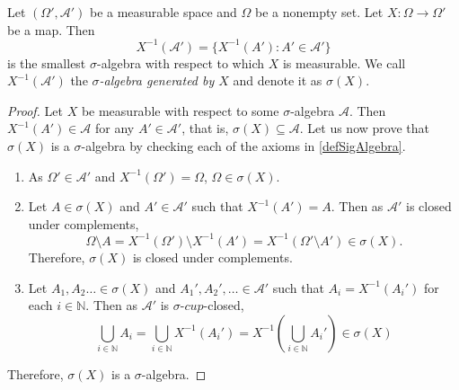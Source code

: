 \begin{theorem}
    Let $(\Omega',\mathcal{A}')$ be a measurable space and $\Omega$ be a nonempty set. Let $X:\Omega\to\Omega'$ be a map. Then
    $$X^{-1}(\mathcal{A}')=\{X^{-1}(A'):A'\in\mathcal{A}'\}$$
    is the smallest $\sigma$-algebra with respect to which $X$ is measurable. We call $X^{-1}(\mathcal{A}')$ the \textit{$\sigma$-algebra generated by $X$} and denote it as $\sigma(X)$.
\end{theorem}
\begin{proof}
    Let $X$ be measurable with respect to some $\sigma$-algebra $\mathcal{A}$. Then $X^{-1}(A')\in\mathcal{A}$ for any $A'\in\mathcal{A}'$, that is, $\sigma(X)\subseteq\mathcal{A}$. Let us now prove that $\sigma(X)$ is a $\sigma$-algebra by checking each of the axioms in \ref{defSigAlgebra}.
    \begin{enumerate}
        \item As $\Omega'\in\mathcal{A}'$ and $X^{-1}(\Omega')=\Omega$, $\Omega\in\sigma(X)$.
        
        \item Let $A\in\sigma(X)$ and $A'\in\mathcal{A}'$ such that $X^{-1}(A')=A$. Then as $\mathcal{A}'$ is closed under complements,
        $$\Omega\setminus A = X^{-1}(\Omega')\setminus X^{-1}(A') = X^{-1}(\Omega'\setminus A')\in\sigma(X).$$
        Therefore, $\sigma(X)$ is closed under complements.
        
        \item Let $A_1,A_2\ldots\in\sigma(X)$ and $A_1',A_2',\ldots\in\mathcal{A}'$ such that $A_i=X^{-1}(A_i')$ for each $i\in\mathbb{N}$. Then as $\mathcal{A}'$ is $\sigma$-$cup$-closed,
        $$\bigcup_{i\in\mathbb{N}} A_i = \bigcup_{i\in\mathbb{N}} X^{-1} (A_i') = X^{-1}(\bigcup_{i\in\mathbb{N}} A_i') \in\sigma(X)$$
    \end{enumerate}
    Therefore, $\sigma(X)$ is a $\sigma$-algebra.
\end{proof}

